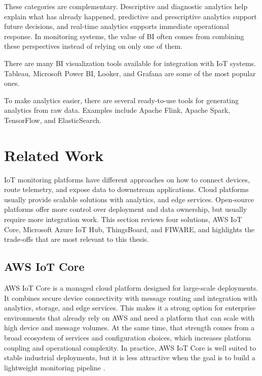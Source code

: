 These categories are complementary. Descriptive and diagnostic analytics help
explain what has already happened, predictive and prescriptive analytics
support future decisions, and real-time analytics supports immediate
operational response. In monitoring systems, the value of \gls{BI} often comes
from combining these perspectives instead of relying on only one of them.

There are many \gls{BI} visualization tools available for integration with \gls{IoT} systems.
Tableau, Microsoft Power BI, Looker, and Grafana are some of the most popular ones.

To make analytics easier, there are several ready-to-use tools for generating
analytics from raw data. Examples include Apache Flink, Apache Spark,
TensorFlow, and ElasticSearch.

\section{Related Work}
IoT monitoring platforms have different approaches on how to connect devices, route telemetry,
and expose data to downstream applications. Cloud platforms usually provide scalable solutions with analytics, and edge
services. Open-source platforms offer more control over deployment and data
ownership, but usually require more integration work. This section reviews four solutions, AWS IoT Core, Microsoft Azure IoT Hub, ThingsBoard,
and FIWARE, and highlights the trade-offs that are most relevant to this thesis.

\subsection{AWS IoT Core}
AWS IoT Core is a managed cloud platform designed for large-scale deployments.
It combines secure device connectivity with message routing and
integration with analytics, storage, and edge services. This makes it a strong
option for enterprise environments that already rely on AWS and need a platform
that can scale with high device and message volumes. At the same time, that
strength comes from a broad ecosystem of services and configuration choices,
which increases platform coupling and operational complexity. In practice, AWS
IoT Core is well suited to stable industrial deployments, but it is less
attractive when the goal is to build a lightweight monitoring pipeline
\cite{panagou2025comprehensive, s22062196, article5}.

